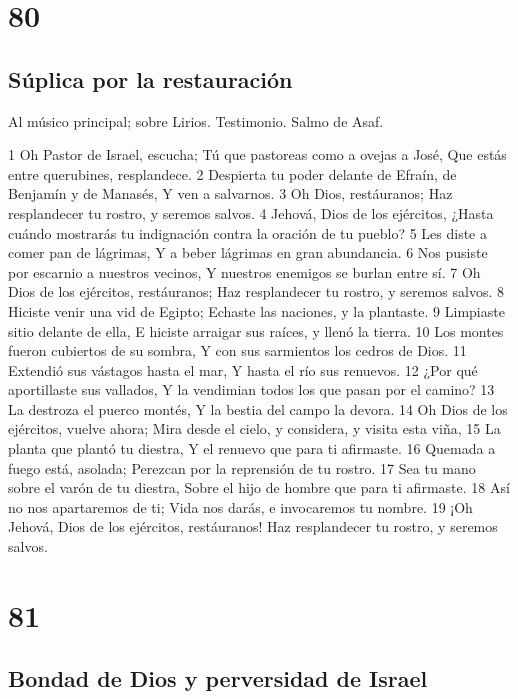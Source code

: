 \chapter{80}

\section*{Súplica por la restauración}

Al músico principal; sobre Lirios. Testimonio. Salmo de Asaf.

1 Oh Pastor de Israel, escucha;
Tú que pastoreas como a ovejas a José,
Que estás entre querubines, resplandece.
2 Despierta tu poder delante de Efraín, de Benjamín y de Manasés,
Y ven a salvarnos.
3 Oh Dios, restáuranos;
Haz resplandecer tu rostro, y seremos salvos.
4 Jehová, Dios de los ejércitos,
¿Hasta cuándo mostrarás tu indignación contra la oración de tu pueblo?
5 Les diste a comer pan de lágrimas,
Y a beber lágrimas en gran abundancia.
6 Nos pusiste por escarnio a nuestros vecinos,
Y nuestros enemigos se burlan entre sí.
7 Oh Dios de los ejércitos, restáuranos;
Haz resplandecer tu rostro, y seremos salvos.
8 Hiciste venir una vid de Egipto;
Echaste las naciones, y la plantaste.
9 Limpiaste sitio delante de ella,
E hiciste arraigar sus raíces, y llenó la tierra.
10 Los montes fueron cubiertos de su sombra,
Y con sus sarmientos los cedros de Dios.
11 Extendió sus vástagos hasta el mar,
Y hasta el río sus renuevos.
12 ¿Por qué aportillaste sus vallados,
Y la vendimian todos los que pasan por el camino?
13 La destroza el puerco montés,
Y la bestia del campo la devora.
14 Oh Dios de los ejércitos, vuelve ahora;
Mira desde el cielo, y considera, y visita esta viña,
15 La planta que plantó tu diestra,
Y el renuevo que para ti afirmaste.
16 Quemada a fuego está, asolada;
Perezcan por la reprensión de tu rostro.
17 Sea tu mano sobre el varón de tu diestra,
Sobre el hijo de hombre que para ti afirmaste.
18 Así no nos apartaremos de ti;
Vida nos darás, e invocaremos tu nombre.
19 ¡Oh Jehová, Dios de los ejércitos, restáuranos!
Haz resplandecer tu rostro, y seremos salvos.

\chapter{81}

\section*{Bondad de Dios y perversidad de Israel}

